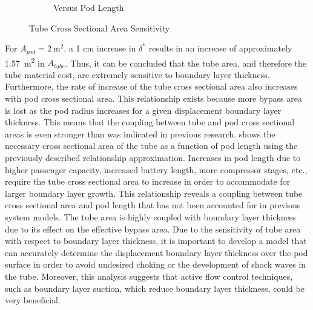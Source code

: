 \begin{figure}
\begin{subfigure}{.5\textwidth}
  \caption{Versus Pod Length}
  \label{fig:tube_area_vs_length}
\end{subfigure}
\caption{Tube Cross Sectional Area Sensitivity}
\label{fig:topTubeArea}
\end{figure}

For $A_{pod} = \SI{2}{\metre\squared}$, a 1 cm increase in $\delta^{*}$
results in an increase of approximately \SI{1.57}{\metre\squared} in $A_{tube}$.
Thus, it can be concluded that the tube area, and therefore the tube material cost,
are extremely sensitive to boundary layer thickness. Furthermore, the rate of
increase of the tube cross sectional area also increases with pod cross sectional area.
This relationship exists because more bypass area is lost as the pod radius
increases for a given displacement boundary layer thickness. This means that
the coupling between tube and pod cross sectional areas is even stronger than
was indicated in previous research.
 shows the necessary cross sectional area of the
tube as a function of pod length using the previously described relationship
approximation. Increases in pod length due to higher passenger
capacity, increased battery length, more compressor stages, etc., require the
tube cross sectional area to increase in order to accommodate for larger
boundary layer growth. This relationship reveals a coupling between tube cross
sectional area and pod length that has not been accounted for in previous system models.
The tube area is highly coupled with boundary layer thickness due to its effect on the effective bypass area.
Due to the sensitivity of tube area with respect to boundary layer thickness,
it is important to develop a model that can accurately determine the
displacement boundary layer thickness over the pod surface in order to avoid
undesired choking or the development of shock waves in the tube. Moreover,
this analysis suggests that active flow control techniques, such as boundary layer suction,
which reduce boundary layer thickness, could be very beneficial.

